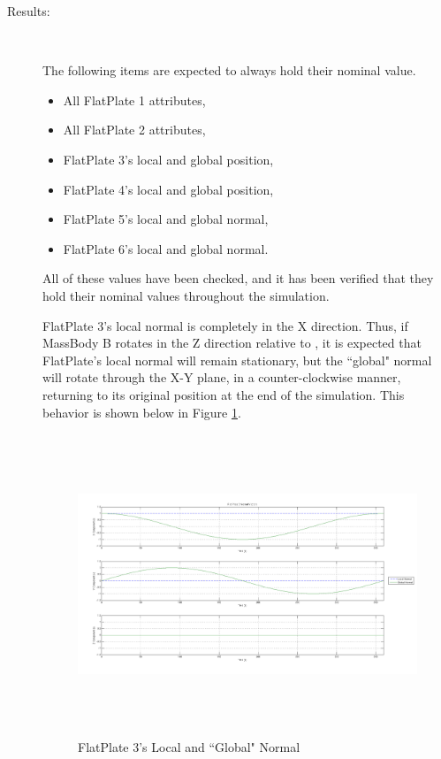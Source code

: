 \begin{description}
\item[Results:] \ \newline

The following items are expected to always hold their nominal value.

\begin{itemize}
\item{All FlatPlate 1 attributes},
\item{All FlatPlate 2 attributes},
\item{FlatPlate 3's local and global position},
\item{FlatPlate 4's local and global position},
\item{FlatPlate 5's local and global normal},
\item{FlatPlate 6's local and global normal}.
\end{itemize}

All of these values have been checked, and it has been verified that they hold
their nominal values throughout the simulation.

FlatPlate 3's local normal is completely in the X direction. Thus, if MassBody B
rotates in the Z direction relative to , it is expected that FlatPlate's local normal will
remain stationary, but the ``global" normal will rotate through the X-Y plane, in a
counter-clockwise manner, returning to its original position at the end of the
simulation. This behavior is shown below in Figure \ref{fig:artic_normal_3}.

\begin{figure}[H]
\begin{center}
\includegraphics[height=90mm]{figs/art_test_0.png}
\caption{FlatPlate 3's Local and ``Global" Normal}
\label{fig:artic_normal_3}
\end{center}
\end{figure}


\end{description}

